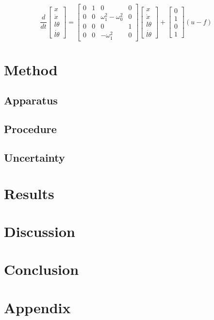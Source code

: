 \documentclass{article}
\begin{document}
\begin{equation}
  \frac{d}{dt} 
  \begin{bmatrix}
     x \\ \dot{x} \\ l\theta \\ \dot{l\theta} \end{bmatrix} = \begin{bmatrix} 
      0 & 1 & 0 & 0 \\ 0 & 0 & \omega_1^2 - \omega_0^2 & 0 \\ 0 & 0 & 0 & 1 \\ 0 & 0 & -\omega_1^2 & 0 \end{bmatrix} \begin{bmatrix} 
        x \\ \dot{x} \\ l\theta \\ \dot{l\theta} \end{bmatrix} + \begin{bmatrix} 
          0 \\ 1 \\ 0 \\ 1 \end{bmatrix} (u - f)
\end{equation}

\section{Method}

\subsection{Apparatus}


\subsection{Procedure}


\subsection{Uncertainty}



\section{Results}


\section{Discussion}



\section{Conclusion}


\newpage
\section{Appendix}


\newpage
\begin{thebibliography}{9}

\end{thebibliography}
\end{document}
